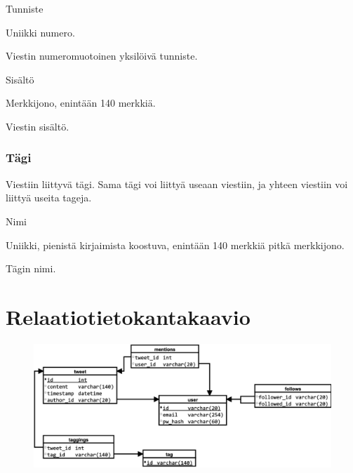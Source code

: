 \documentclass{article}
\let\stdsection\section
\renewcommand\section{\newpage\stdsection}
\begin{document}
\begin{description}[itemsep=0pt]
    \item[Attribuutti] Tunniste
    \item[Arvojoukko] Uniikki numero.
    \item[Kuvailu] Viestin numeromuotoinen yksilöivä tunniste.
\end{description}

\begin{description}[itemsep=0pt]
    \item[Attribuutti] Sisältö
    \item[Arvojoukko] Merkkijono, enintään 140 merkkiä.
    \item[Kuvailu] Viestin sisältö.
\end{description}

\subsubsection{Tägi}

Viestiin liittyvä tägi. Sama tägi voi liittyä useaan viestiin, ja yhteen viestiin voi liittyä useita tageja.

\begin{description}[itemsep=0pt]
    \item[Attribuutti] Nimi
    \item[Arvojoukko] Uniikki, pienistä kirjaimista koostuva, enintään 140 merkkiä pitkä merkkijono.
    \item[Kuvailu] Tägin nimi.
\end{description}

\section{Relaatiotietokantakaavio}

\begin{figure}[H]
    \centering
    \includegraphics[width=\textwidth]{tietokanta.pdf}
\end{figure}
\end{document}
